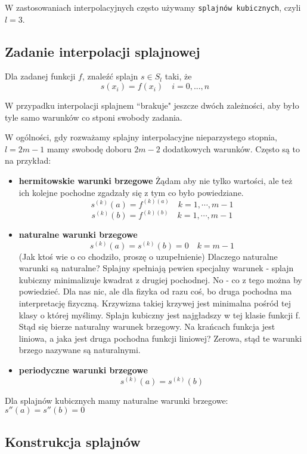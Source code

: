 \documentclass[hidelinks,a4paper,fleqn,oneside]{book}
\begin{document}
W zastosowaniach interpolacyjnych często używamy \texttt{splajnów kubicznych}, czyli $l=3$.

\subsection{Zadanie interpolacji splajnowej} Dla zadanej funkcji $f$, znaleźć splajn $s \in S_l$ taki, że \[s(x_i) = f(x_i)\quad i=0, ..., n\]

W przypadku interpolacji splajnem ``brakuje" jeszcze dwóch zależności, aby było tyle samo warunków co stponi swobody zadania.

W ogólności, gdy rozważamy splajny interpolacyjne nieparzystego stopnia, $l=2m-1$ mamy swobodę doboru $2m-2$ dodatkowych warunków. Często są to na przykład:

\begin{itemize}
	\item \textbf{hermitowskie warunki brzegowe}
	Żądam aby nie tylko wartości, ale też ich kolejne pochodne zgadzały się z tym co było powiedziane.
	\[
		s^{(k)}(a) = f^{(k)(a)} \quad k = 1, \cdots, m-1
	\]
	\[
		s^{(k)}(b) = f^{(k)(b)} \quad k = 1, \cdots, m-1
	\]
	
	\item \textbf{naturalne warunki brzegowe}
	\[
		s^{(k)}(a) = s^{(k)}(b) = 0 \quad k = m-1
	\]
	(Jak ktoś wie o co chodziło, proszę o uzupełnienie) Dlaczego naturalne warunki są naturalne? Splajny spełniają pewien specjalny warunek - splajn kubiczny minimalizuje kwadrat z drugiej pochodnej. No - co z tego można by powiedzieć. Dla nas nic, ale dla fizyka od razu coś, bo druga pochodna ma interpretację fizyczną. Krzywizna takiej krzywej jest minimalna pośród tej klasy o której myślimy. Splajn kubiczny jest najgładszy w tej klasie funkcji f. Stąd się bierze naturalny warunek brzegowy. Na krańcach funkcja jest liniowa, a jaka jest druga pochodna funkcji liniowej? Zerowa, stąd te warunki brzego nazywane są naturalnymi.
	
	\item \textbf{periodyczne warunki brzegowe}
	\[
		s^{(k)}(a) = s^{(k)}(b)
	\]
\end{itemize}

Dla splajnów kubicznych mamy naturalne warunki brzegowe: $s''(a) = s''(b) = 0$

\subsection{Konstrukcja splajnów}
\end{document}
